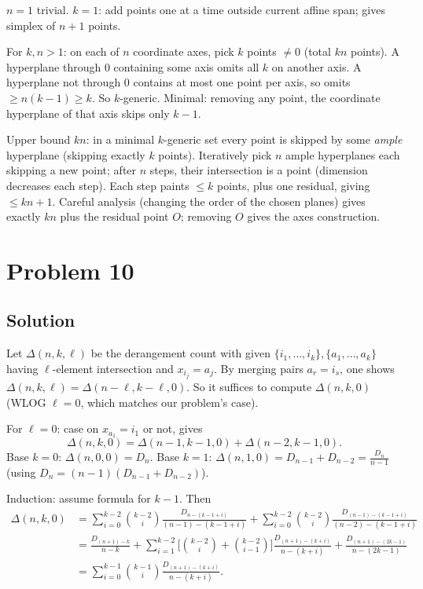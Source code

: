 \documentclass{article}
\begin{document}
$n = 1$ trivial. $k = 1$: add points one at a time outside current affine span; gives simplex of $n+1$ points.

For $k, n > 1$: on each of $n$ coordinate axes, pick $k$ points $\ne 0$ (total $kn$ points). A hyperplane through $0$ containing some axis omits all $k$ on another axis. A hyperplane not through $0$ contains at most one point per axis, so omits $\ge n(k-1) \ge k$. So $k$-generic. Minimal: removing any point, the coordinate hyperplane of that axis skips only $k-1$.

Upper bound $kn$: in a minimal $k$-generic set every point is skipped by some \emph{ample} hyperplane (skipping exactly $k$ points). Iteratively pick $n$ ample hyperplanes each skipping a new point; after $n$ steps, their intersection is a point (dimension decreases each step). Each step paints $\le k$ points, plus one residual, giving $\le kn + 1$. Careful analysis (changing the order of the chosen planes) gives exactly $kn$ plus the residual point $O$; removing $O$ gives the axes construction.

\section*{Problem 10}
\subsection*{Solution}
Let $\Delta(n, k, \ell)$ be the derangement count with given $\{i_1,\dots,i_k\}, \{a_1,\dots,a_k\}$ having $\ell$-element intersection and $x_{i_j} = a_j$. By merging pairs $a_r = i_s$, one shows $\Delta(n,k,\ell) = \Delta(n-\ell, k-\ell, 0)$. So it suffices to compute $\Delta(n,k,0)$ (WLOG $\ell = 0$, which matches our problem's case).

For $\ell = 0$: case on $x_{a_1} = i_1$ or not, gives
\[ \Delta(n, k, 0) = \Delta(n-1, k-1, 0) + \Delta(n-2, k-1, 0). \]
Base $k=0$: $\Delta(n, 0, 0) = D_n$. Base $k=1$: $\Delta(n,1,0) = D_{n-1} + D_{n-2} = \frac{D_n}{n-1}$ (using $D_n = (n-1)(D_{n-1}+D_{n-2})$).

Induction: assume formula for $k-1$. Then
\begin{align*}
\Delta(n,k,0) &= \sum_{i=0}^{k-2}\binom{k-2}{i}\frac{D_{n-(k-1+i)}}{(n-1)-(k-1+i)} + \sum_{i=0}^{k-2}\binom{k-2}{i}\frac{D_{(n-1)-(k-1+i)}}{(n-2)-(k-1+i)} \\
&= \frac{D_{(n+1)-k}}{n-k} + \sum_{i=1}^{k-2}\Big[\binom{k-2}{i}+\binom{k-2}{i-1}\Big]\frac{D_{(n+1)-(k+i)}}{n-(k+i)} + \frac{D_{(n+1)-(2k-1)}}{n-(2k-1)} \\
&= \sum_{i=0}^{k-1}\binom{k-1}{i}\frac{D_{(n+1)-(k+i)}}{n-(k+i)}.
\end{align*}
\end{document}

